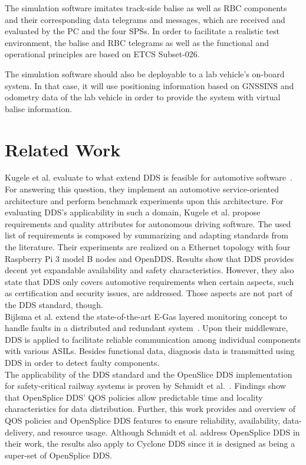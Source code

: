 \documentclass[a4paper, 12pt]{scrartcl}
\begin{document}
The simulation software imitates track-side balise as well as \ac{RBC} components and their corresponding data telegrams and messages, which are received and evaluated by the PC and the four \acp{SPS}.
In order to facilitate a realistic test environment, the balise and \ac{RBC} telegrams as well as the functional and operational principles are based on \ac{ETCS} Subset-026.

The simulation software should also be deployable to a lab vehicle's on-board system.
In that case, it will use positioning information based on \ac{GNSSINS} and odometry data of the lab vehicle in order to provide the system with virtual balise information.


\section*{Related Work}
Kugele et al. evaluate to what extend \ac{DDS} is feasible for automotive software~\cite{KugeleDataCentricForAuto}.
For answering this question, they implement an automotive service-oriented architecture and perform benchmark experiments upon this architecture.
For evaluating \ac{DDS}'s applicability in such a domain, Kugele et al. propose requirements and quality attributes for autonomous driving software.
The used list of requirements is composed by summarizing and adapting standards from the literature.
Their experiments are realized on a Ethernet topology with four Raspberry Pi 3 model B nodes and OpenDDS.
Results show that \ac{DDS} provides decent yet expandable availability and safety characteristics.
However, they also state that \ac{DDS} only covers automotive requirements when certain aspects, such as certification and security issues, are addressed.
Those aspects are not part of the \ac{DDS} standard, though.
\\

Bijlsma et al. extend the state-of-the-art E-Gas layered monitoring concept to handle faults in a distributed and redundant system~\cite{DistributedSafety2020}.
Upon their middleware, \ac{DDS} is applied to facilitate reliable communication among individual components with various \acp{ASIL}.
Besides functional data, diagnosis data is transmitted using \ac{DDS} in order to detect faulty components.
\\

The applicability of the \ac{DDS} standard and the OpenSlice DDS implementation for safety-critical railway systems is proven by Schmidt et al.~\cite{SchmidtMissionCriticalChallenges}.
Findings show that OpenSplice DDS' \ac{QOS} policies allow predictable time and locality characteristics for data distribution.
Further, this work provides and overview of \ac{QOS} policies and OpenSplice DDS features to ensure reliability, availability, data-delivery, and resource usage.
Although Schmidt et al. address OpenSplice DDS in their work, the results also apply to Cyclone DDS since it is designed as being a super-set of OpenSplice DDS.
\\
\end{document}
